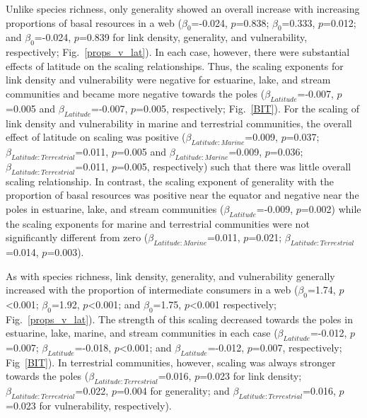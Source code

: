 \documentclass[12pt]{article}
\begin{document}
  Unlike species richness, only generality showed an overall increase with increasing
  proportions of basal resources in a web ($\beta_0$=-0.024, $p$=0.838;
  $\beta_0$=0.333, $p$=0.012; and $\beta_0$=-0.024, $p$=0.839 for link
  density, generality, and vulnerability, respectively;
  Fig.~\ref{props_v_lat}). In each case, however, there were substantial
  effects of latitude on the scaling relationships. Thus, the scaling
  exponents for link density and vulnerability were negative for estuarine,
  lake, and stream communities and became more negative towards the poles
  ($\beta_{Latitude}$=-0.007, $p$=0.005 and $\beta_{Latitude}$=-0.007,
  $p$=0.005, respectively; Fig.~\ref{BIT}). For the scaling of link density and
  vulnerability in marine and terrestrial communities, the overall effect of
  latitude on scaling was positive ($\beta_{Latitude:Marine}$=0.009,
  $p$=0.037; $\beta_{Latitude:Terrestrial}$=0.011, $p$=0.005 and
  $\beta_{Latitude:Marine}$=0.009, $p$=0.036;
  $\beta_{Latitude:Terrestrial}$=0.011, $p$=0.005, respectively) such that
  there was little overall scaling relationship. In contrast, the scaling
  exponent of generality with the proportion of basal resources was positive
  near the equator and negative near the poles in estuarine, lake, and stream
  communities ($\beta_{Latitude}$=-0.009, $p$=0.002) while the scaling
  exponents for marine and terrestrial communities were not significantly
  different from zero ($\beta_{Latitude:Marine}$=0.011, $p$=0.021;
  $\beta_{Latitude:Terrestrial}$=0.014, $p$=0.003).


  As with species richness, link density, generality, and vulnerability
  generally increased with the proportion of intermediate consumers in a web
  ($\beta_0$=1.74, $p$\textless0.001; $\beta_0$=1.92, $p$\textless0.001; and
  $\beta_0$=1.75, $p$\textless0.001 respectively; Fig.~\ref{props_v_lat}). The
  strength of this scaling decreased towards the poles in estuarine, lake,
  marine, and stream communities in each case ($\beta_{Latitude}$=-0.012,
  $p$=0.007; $\beta_{Latitude}$=-0.018, $p$\textless0.001; and
  $\beta_{Latitude}$=-0.012, $p$=0.007, respectively; Fig~\ref{BIT}). In
  terrestrial communities, however, scaling was always stronger towards
  the poles ($\beta_{Latitude:Terrestrial}$=0.016, $p$=0.023 for link density;
  $\beta_{Latitude:Terrestrial}$=0.022, $p$=0.004 for generality; and
  $\beta_{Latitude:Terrestrial}$=0.016, $p$=0.023 for vulnerability,
  respectively).
\end{document}
